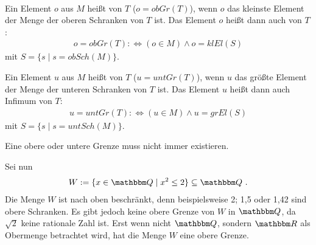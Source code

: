 \begin{Unit}
\ 

\begin{Definition}
  Ein Element $o$ aus $M$ heißt  
  von $T$ ($o = obGr(T)$), wenn $o$ das kleinste Element der Menge der oberen 
  Schranken von $T$ ist. Das Element $o$ heißt dann auch  
  von $T$:
  \begin{align}
    o = obGr(T) :\Leftrightarrow (o \in M) \land o = klEl(S) 
  \end{align}
  mit $S = \{s \mid s = obSch(M) \}$.

  Ein Element $u$ aus $M$ heißt  von $T$ ($u = untGr(T)$), wenn $u$ das größte Element der Menge der 
  unteren Schranken von $T$ ist. Das Element $u$ heißt dann auch \Begriff
  {Infimum} von $T$:
  \begin{align}
    u = untGr(T) :\Leftrightarrow (u \in M) \land u = grEl(S) 
  \end{align}
  mit $S = \{s \mid s = untSch(M)\}$.
\end{Definition}

Eine obere oder untere Grenze muss nicht immer existieren. 
\end{Unit}

\begin{Unit}[Beispiel]
  Sei nun
  \begin{align}
    W := \{x \in \QQ \mid x^2 \leq 2 \} \subseteq \QQ \ .
  \end{align}
  Die Menge $W$ ist nach oben beschränkt, denn beispielsweise 2; 1,5 oder 
  1,42 sind obere Schranken. Es gibt jedoch keine obere Grenze von $W$ in 
  $\QQ$, da $\sqrt{2}$ keine rationale Zahl ist. Erst wenn nicht $\QQ$, 
  sondern $\RR$ als Obermenge betrachtet wird, hat die Menge $W$ eine obere 
  Grenze.
\end{Unit}

